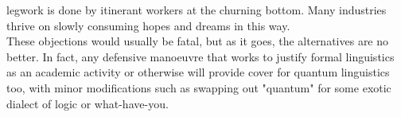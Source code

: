 legwork is done by itinerant workers at the churning bottom. Many industries thrive on slowly consuming hopes and dreams in this way.\\

These objections would usually be fatal, but as it goes, the alternatives are no better. In fact, any defensive manoeuvre that works to justify formal linguistics as an academic activity or otherwise will provide cover for quantum linguistics too, with minor modifications such as swapping out "quantum" for some exotic dialect of logic or what-have-you.